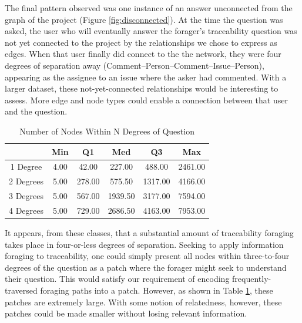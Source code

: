 \documentclass[conference]{IEEEtran}
\begin{document}
The final pattern observed was one instance of an answer unconnected from the graph of the project (Figure \ref{fig:disconnected}). At the time the question was asked, the user who will eventually answer the forager's traceability question was not yet connected to the project by the relationships we chose to express as edges. When that user finally did connect to the the network, they were four degrees of separation away (Comment--Person--Comment--Issue--Person), appearing as the assignee to an issue where the asker had commented. With a larger dataset, these not-yet-connected relationships would be interesting to assess. More edge and node types could enable a connection between that user and the question.

\begin{table}[!ht]
	\caption{Number of Nodes Within N Degrees of Question}
	\centering
		\begin{tabular}{ |c||c|c|c|c|c|  }
		\hline
		& Min & Q1 & Med & Q3 & Max \\
		\hline
		1 Degree & 4.00 & 42.00 & 227.00 & 488.00 & 2461.00 \\
		2 Degrees & 5.00 & 278.00 & 575.50 & 1317.00 & 4166.00 \\
		3 Degrees & 5.00 & 567.00 & 1939.50 & 3177.00 & 7594.00 \\
		4 Degrees & 5.00 & 729.00 & 2686.50 & 4163.00 & 7953.00 \\
		\hline
	\end{tabular}
	\label{tab:radiusStats}
\end{table}
It appears, from these classes, that a substantial amount of traceability foraging takes place in four-or-less degrees of separation. Seeking to apply information foraging to traceability, one could simply present all nodes within three-to-four degrees of the question as a patch where the forager might seek to understand their question. This would satisfy our requirement of encoding frequently-traversed foraging paths into a patch. However, as shown in Table \ref{tab:radiusStats}, these patches are extremely large. With some notion of relatedness, however, these patches could be made smaller without losing relevant information.

\end{document}
